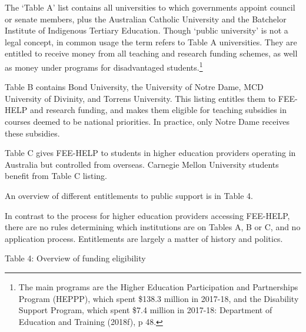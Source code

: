 \documentclass[]{book}
\begin{document}
The `Table A' list contains all universities to which governments appoint council or senate members, plus the Australian Catholic University and the Batchelor Institute of Indigenous Tertiary Education. Though `public university' is not a legal concept, in common usage the term refers to Table A universities. They are entitled to receive money from all teaching and research funding schemes, as well as money under programs for disadvantaged students.\footnote{The main programs are the Higher Education Participation and Partnerships Program (HEPPP), which spent \$138.3 million in 2017-18, and the Disability Support Program, which spent \$7.4 million in 2017-18: Department of Education and Training (2018f), p 48.}

Table B contains Bond University, the University of Notre Dame, MCD University of Divinity, and Torrens University. This listing entitles them to FEE-HELP and research funding, and makes them eligible for teaching subsidies in courses deemed to be national priorities. In practice, only Notre Dame receives these subsidies.

Table C gives FEE-HELP to students in higher education providers operating in Australia but controlled from overseas. Carnegie Mellon University students benefit from Table C listing.

An overview of different entitlements to public support is in Table 4.

In contrast to the process for higher education providers accessing FEE-HELP, there are no rules determining which institutions are on Tables A, B or C, and no application process. Entitlements are largely a matter of history and politics.

\protect\hypertarget{_Ref311636093}{}{}Table 4: Overview of funding eligibility
\end{document}
